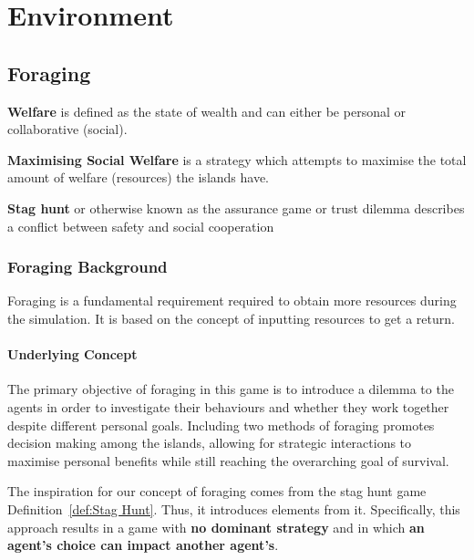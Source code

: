 \chapter{Environment}
\section{Foraging}

\begin{definition} \label{def:Welfare}
\textbf{Welfare} is defined as the state of wealth and can either be personal or collaborative (social).
\end{definition}

\begin{definition} \label{def:Maximising Social Welfare}
\textbf{Maximising Social Welfare} is a strategy which attempts to maximise the total amount of welfare (resources) the islands have.
\end{definition}

\begin{definition} \label{def:Stag Hunt}
\textbf{Stag hunt} or otherwise known as the assurance game or trust dilemma describes a conflict between safety and social cooperation
\end{definition}


\subsection{Foraging Background}

Foraging is a fundamental requirement required to obtain more resources during the simulation. It is based on the concept of inputting resources to get a return.

\subsubsection{Underlying Concept}

The primary objective of foraging in this game is to introduce a dilemma to the agents in order to investigate their behaviours and whether they work together despite different personal goals. Including two methods of foraging promotes decision making among the islands, allowing for strategic interactions to maximise personal benefits while still reaching the overarching goal of survival. 

The inspiration for our concept of foraging comes from the stag hunt game Definition~\ref{def:Stag Hunt}. Thus, it introduces elements from it. Specifically, this approach results in a game with \textbf{no dominant strategy} and in which \textbf{an agent's choice can impact another agent's}.

